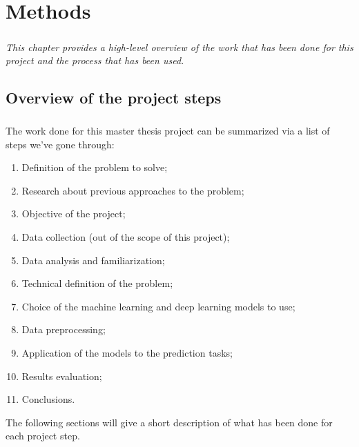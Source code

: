 
\chapter{Methods} \label{chap: methods}

\paragraph{} \textit{This chapter provides a high-level overview of the work that has been done for this project and the process that has been used.}


\section{Overview of the project steps} \label{sec: overview_project_steps}
\paragraph{} The work done for this master thesis project can be summarized via a list of steps we've gone through:
\begin{enumerate}
    \item Definition of the problem to solve;
    \item Research about previous approaches to the problem;
    \item Objective of the project;
    \item Data collection (out of the scope of this project);
    \item Data analysis and familiarization;
    \item Technical definition of the problem;
    \item Choice of the machine learning and deep learning models to use;
    \item Data preprocessing;
    \item Application of the models to the prediction tasks;
    \item Results evaluation;
    \item Conclusions.
\end{enumerate}
The following sections will give a short description of what has been done for each project step.

